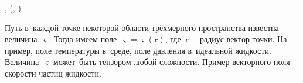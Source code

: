 \begin{otherlanguage}{russian}
\end{otherlanguage}



\label{para:differentiationoftensorfields}

\begin{otherlanguage}{russian}

\begin{changemargin}{\parindent}{\parindent}
\vspace{-0.1em}
\small \flushright \textit{}\ru{\:---} ,  (, )
\par\vspace{.25em}
\end{changemargin}

\noindent Путь в~каждой точке некоторой области трёхмерного пространства
известна величина~$\varsigma$. Тогда имеем поле~${\varsigma \!=\! \varsigma(\bm{r})}$, где~$\bm{r}$\:--- радиус\hbox{-}вектор точки. Например, поле температуры в~среде, поле давления в~идеальной жидкости. Величина~$\varsigma$ может~быть тензором любой сложности. Пример векторного поля\:--- скорости частиц жидкости.

\end{otherlanguage}



